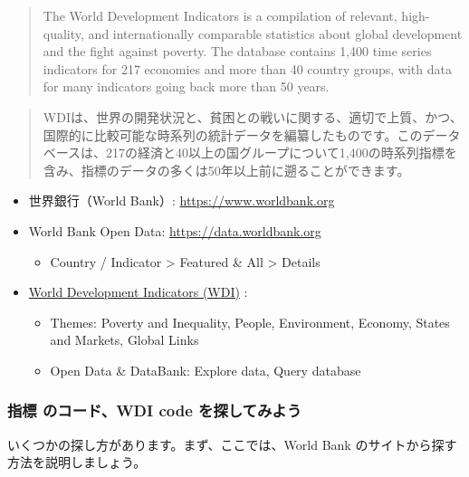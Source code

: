 \documentclass[
]{bxjsbook}
\providecommand{\tightlist}{%
  \setlength{\itemsep}{0pt}\setlength{\parskip}{0pt}}
\theoremstyle{definition}
\theoremstyle{definition}
\theoremstyle{definition}
\theoremstyle{definition}
\theoremstyle{remark}
\begin{document}
\begin{quote}
The World Development Indicators is a compilation of relevant, high-quality, and internationally comparable statistics about global development and the fight against poverty. The database contains 1,400 time series indicators for 217 economies and more than 40 country groups, with data for many indicators going back more than 50 years.
\end{quote}

\begin{quote}
WDIは、世界の開発状況と、貧困との戦いに関する、適切で上質、かつ、国際的に比較可能な時系列の統計データを編纂したものです。このデータベースは、217の経済と40以上の国グループについて1,400の時系列指標を含み、指標のデータの多くは50年以上前に遡ることができます。
\end{quote}

\begin{itemize}
\tightlist
\item
  世界銀行（World Bank）: \url{https://www.worldbank.org}
\item
  World Bank Open Data: \url{https://data.worldbank.org}

  \begin{itemize}
  \tightlist
  \item
    Country / Indicator \textgreater{} Featured \& All \textgreater{} Details
  \end{itemize}
\item
  \href{https://datatopics.worldbank.org/world-development-indicators/}{World Development Indicators (WDI)} :

  \begin{itemize}
  \tightlist
  \item
    Themes: Poverty and Inequality, People, Environment, Economy, States and Markets, Global Links
  \item
    Open Data \& DataBank: Explore data, Query database
  \end{itemize}
\end{itemize}

\hypertarget{ux6307ux6a19-ux306eux30b3ux30fcux30c9wdi-code-ux3092ux63a2ux3057ux3066ux307fux3088ux3046}{%
\subsubsection{指標 のコード、WDI code を探してみよう}\label{ux6307ux6a19-ux306eux30b3ux30fcux30c9wdi-code-ux3092ux63a2ux3057ux3066ux307fux3088ux3046}}

いくつかの探し方があります。まず、ここでは、World Bank のサイトから探す方法を説明しましょう。
\end{document}
